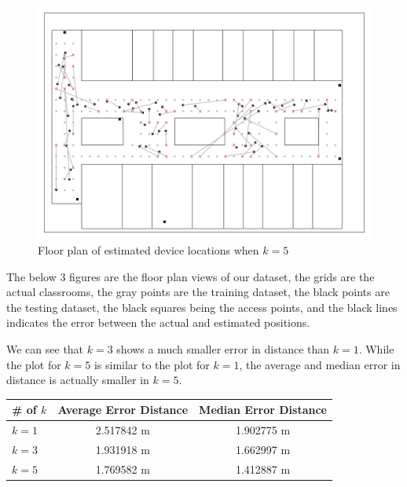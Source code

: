 \documentclass[12pt, conference]{IEEEtran}
\begin{document}
\begin{figure}[htbp]
  \centerline{\includegraphics[width=\columnwidth]{img/Plot-K5FloorPlan-1.png}}
  \caption{Floor plan of estimated device locations when $k=5$}
  \label{fig: K5}
\end{figure}

The below 3 figures are the floor plan views of our dataset, the grids are the actual classrooms, the gray points are the training dataset, the black points are the testing dataset, the black squares being the access points, and the black lines indicates the error between the actual and estimated positions.

We can see that $k=3$ shows a much smaller error in distance than $k=1$. While the plot for $k=5$ is similar to the plot for $k=1$, the average and median error in distance is actually smaller in $k=5$.

\begin{table}[htbp]
  \begin{tabular}{|l|c|c|}
  \hline
  # of $k$   & Average Error Distance & Median Error Distance \\ \hline
  $k=1$        & 2.517842 m             & 1.902775 m            \\ \hline
  $k=3$        & 1.931918 m             & 1.662997 m            \\ \hline
  $k=5$        & 1.769582 m             & 1.412887 m            \\ \hline
  \end{tabular}
\end{table}

\end{document}
